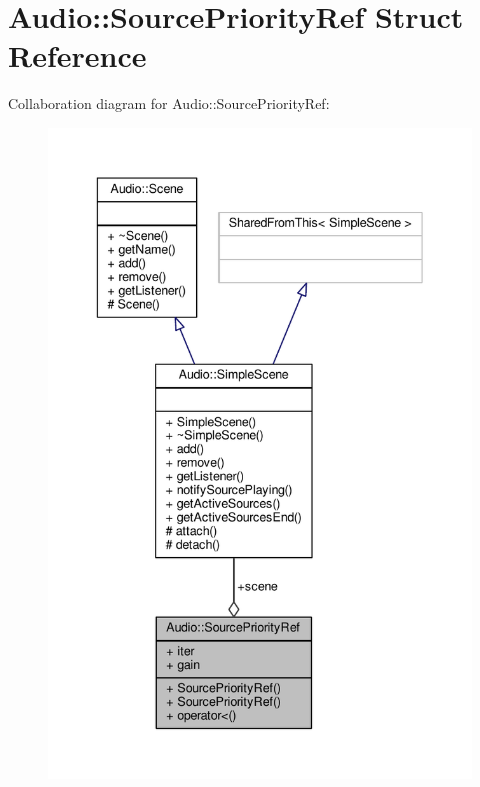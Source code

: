 \hypertarget{structAudio_1_1SourcePriorityRef}{}\section{Audio\+:\+:Source\+Priority\+Ref Struct Reference}
\label{structAudio_1_1SourcePriorityRef}


Collaboration diagram for Audio\+:\+:Source\+Priority\+Ref\+:
\nopagebreak
\begin{figure}[H]
\begin{center}
\leavevmode
\includegraphics[width=342pt]{d0/dec/structAudio_1_1SourcePriorityRef__coll__graph}
\end{center}
\end{figure}
